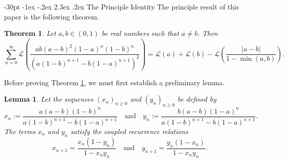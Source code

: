 \documentclass[10pt]{article}
\makeatletter
\renewcommand\section{\@startsection {section}{1}{\z@}
{-30pt \@plus -1ex \@minus -.2ex}
{2.3ex \@plus.2ex}
{\normalfont\normalsize\bfseries\boldmath}}
\newtheorem{theorem}{Theorem}
\newtheorem{lemma}{Lemma}
\theoremstyle{definition}
\makeatother
\begin{document}
\section{The Principle Identity}
The principle result of this paper is the following theorem.
\begin{theorem}\label{thm:main}
    Let $a,b \in (0,1)$ be real numbers such that $a \neq b$.  Then
\begin{equation*}
    \sum_{n=0}^{\infty}\mathcal{L}\left(\frac{ab(a-b)^2(1-a)^n(1-b)^n}{(a(1-b)^{n+1}-b(1-a)^{n+1})^2}\right) = \mathcal{L}(a) + \mathcal{L}(b) - \mathcal{L}\left(\frac{\vert{a-b}\vert}{1-\min(a,b)}\right).
\end{equation*}
\end{theorem}
Before proving Theorem \ref{thm:main}, we must first establish a preliminary lemma.
\begin{lemma}\label{lemma:main}
    Let the sequences $(x_n)_{n\geq 0}$ and $(y_n)_{n\geq 0}$ be defined by
    \begin{equation*}
        x_{n} := \frac{a(a-b)(1-b)^n }{a(1-b)^{n+1} - b(1-a)^{n+1}} \quad \text{and} \quad y_{n} := \frac{b(a-b)(1-a)^n }{a(1-b)^{n+1} - b(1-a)^{n+1}}.
    \end{equation*}
    The terms $x_n$ and $y_n$ satisfy the coupled recurrence relations
    \begin{equation*}
        x_{n+1} = \frac{x_n(1-y_n)}{1-x_n y_n} \quad \text{and} \quad  y_{n+1} = \frac{y_n(1-x_n)}{1-x_n y_n}.
    \end{equation*}
\end{lemma}
\end{document}

